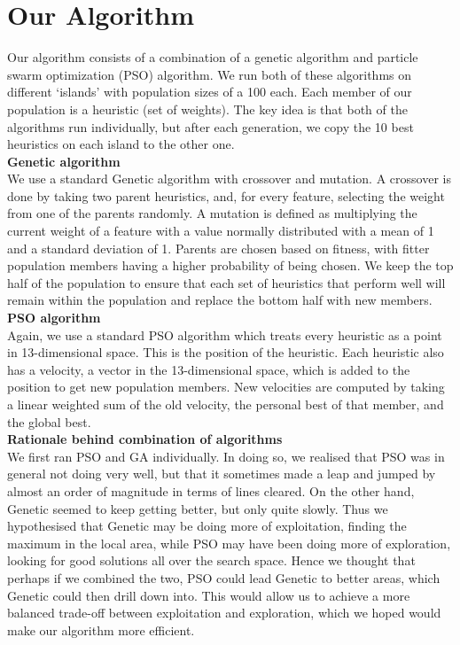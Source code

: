 \documentclass[12pt]{article}
\begin{document}
    \section{Our Algorithm}

    Our algorithm consists of a combination of a genetic algorithm and particle swarm
	optimization (PSO) algorithm. We run both of these algorithms on different ‘islands’
	with population sizes of a 100 each. Each member of our population is a heuristic (set of weights).
	The key idea is that both of the algorithms run individually, but after each generation, we
	copy the 10 best heuristics on each island to the other one.\\

	\textbf{Genetic algorithm}\\
	We use a standard Genetic algorithm with crossover and mutation. A crossover is
	done by taking two parent heuristics, and,
	for every feature, selecting the weight from one of the parents randomly. A
	mutation is defined as multiplying the current weight of a feature with
	a value normally distributed with a mean of 1 and a standard deviation of 1. Parents are chosen based on fitness, with fitter population members having a higher
	probability of being chosen. We keep the top half of the population to ensure that each set of heuristics
	that perform well will remain within the population and replace the bottom half with
	new members.\\

	\textbf{PSO algorithm}\\
	Again, we use a standard PSO algorithm which treats every heuristic as a point in 13-dimensional space.
	This is the position of the heuristic. Each heuristic also has a velocity,
	a vector in the 13-dimensional space, which is added to the position to get
	new population members. New velocities are computed by taking a linear weighted
	sum of the old velocity, the personal best of that member, and the global best.\\

	\textbf{Rationale behind combination of algorithms}\\
	We first ran PSO and GA individually. In doing so, we realised that PSO was in general not doing
	very well, but that it sometimes made a leap and jumped by almost an order of magnitude
	in terms of lines cleared. On the other hand, Genetic seemed to keep getting
	better, but only quite slowly. Thus we hypothesised
	that Genetic may be doing more of exploitation, finding the maximum in the local area,
	while PSO may have been doing more of exploration, looking for good solutions all over
	the search space. Hence we thought that perhaps if we combined the two,
	PSO could lead Genetic to better areas, which Genetic could then drill down into.
	This would allow us to achieve a more balanced trade-off between exploitation
	and exploration, which we hoped would make our algorithm more efficient.
\end{document}
